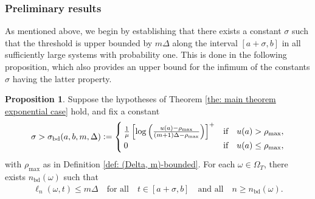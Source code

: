 \documentclass[a4paper, 12pt]{article}
\theoremstyle{definition}
\newtheorem{proposition}[theorem]{Proposition}
\newcommand{\defeq}{\vcentcolon=}
\newcommand{\bd}{\mathrm{bd}}
\begin{document}
\subsubsection{Preliminary results}
\label{subsub: preliminary results}

As mentioned above, we begin by establishing that there exists a constant $\sigma$ such that the threshold is upper bounded by $m \Delta$ along the interval $[a + \sigma, b]$ in all sufficiently large systems with probability one. This is done in the following proposition, which also provides an upper bound for the infimum of the constants $\sigma$ having the latter property.

\begin{proposition}
	\label{prop: bounded threshold}
	Suppose the hypotheses of Theorem \ref{the: main theorem exponential case} hold, and fix a constant
	\begin{align*}
		\sigma > \sigma_\bd(a, b, m, \Delta) \defeq \begin{cases}
			\frac{1}{\mu}\left[\log\left(\frac{u(a) - \rho_{\max}}{(m + 1) \Delta - \rho_{\max}}\right)\right]^+	&	\text{if} \quad u(a) > \rho_{\max}, \\
			0	&	\text{if} \quad u(a) \leq \rho_{\max},
		\end{cases}
	\end{align*}
	with $\rho_{\max}$ as in Definition \ref{def: (Delta, m)-bounded}. For each $\omega \in \Omega_T$, there exists $n_\bd(\omega)$ such that
	\begin{align*}
		\ell_n(\omega, t) \leq m \Delta \quad \text{for all} \quad t \in [a + \sigma, b] \quad \text{and all} \quad n \geq n_\bd(\omega).
	\end{align*}
\end{proposition}
\end{document}
